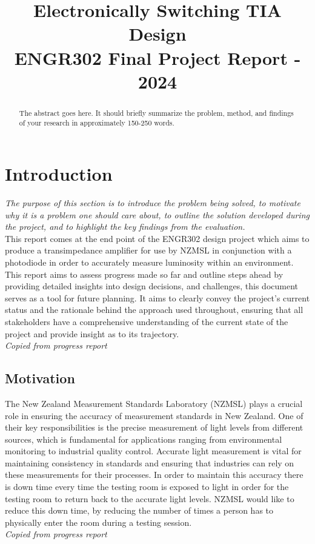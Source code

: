 \documentclass[conference]{IEEEtran}
\title{Electronically Switching TIA Design \\
    \large ENGR302 Final Project Report - 2024}
\author{
    \IEEEauthorblockN{Evgeny Zhilkin, Louis Smith, Mario Pankusz, Max Mawby}
    \IEEEauthorblockA{
        Electrical \& Electronics Engineering \\
        Te Herenga Waka - Victoria University of Wellington \\
        Wellington, Aotearoa New Zealand \\
    }
}
\begin{document}
\maketitle

\begin{abstract}
The abstract goes here. It should briefly summarize the problem, method, and findings of your research in approximately 150-250 words.
\end{abstract}


\section{Introduction}
\textit{ The purpose of this section is to introduce the problem being solved, to motivate why it is a problem one should care about, to outline the solution developed during the project, and to highlight the key findings from the evaluation.} \\

This report comes at the end point of the ENGR302 design project which aims to produce a transimpedance amplifier for use by NZMSL in conjunction with a photodiode in order to accurately measure luminosity within an environment. This report aims to assess progress made so far and outline steps ahead by providing detailed insights into design decisions, and challenges, this document serves as a tool for future planning. It aims to clearly convey the project’s current status and the rationale behind the approach used throughout, ensuring that all stakeholders have a comprehensive understanding of the current state of the project and provide insight as to its trajectory. \\
\textit{Copied from progress report}

\subsection{Motivation}

The New Zealand Measurement Standards Laboratory (NZMSL) plays a crucial role in ensuring the accuracy of measurement standards in New Zealand. One of their key responsibilities is the precise measurement of light levels from different sources, which is fundamental for applications ranging from environmental monitoring to industrial quality control. Accurate light measurement is vital for maintaining consistency in standards and ensuring that industries can rely on these measurements for their processes. In order to maintain this accuracy there is down time every time the testing room is exposed to light in order for the testing room to return back to the accurate light levels. NZMSL would like to reduce this down time, by reducing the number of times a person has to physically enter the room during a testing session. \\
\textit{Copied from progress report}
\end{document}
